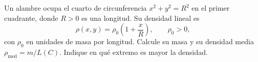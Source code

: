 Un alambre ocupa el cuarto de circunferencia $x^2+y^2=R^2$ en el primer cuadrante, donde $R>0$ es una longitud. Su densidad lineal es
\[
\rho(x,y)=\rho_0\left(1+\frac{x}{R}\right),\qquad \rho_0>0,
\]
con $\rho_0$ en unidades de masa por longitud. Calcule su masa y su densidad media $\rho_{\mathrm{med}}=m/L(C)$. Indique en qué extremo es mayor la densidad.
